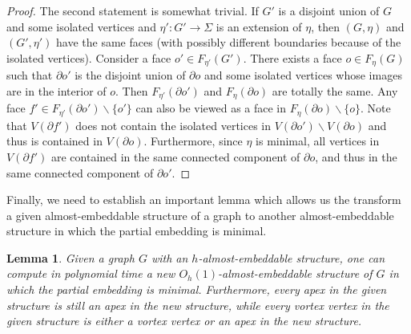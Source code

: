 \documentclass[a4paper,11pt]{article}
\newtheorem{lemma}{Lemma}
\numberwithin{lemma}{section}
\begin{document}
\begin{proof}
The second statement is somewhat trivial.
If $G'$ is a disjoint union of $G$ and some isolated vertices and $\eta'\colon G' \rightarrow \varSigma$ is an extension of $\eta$, then $(G,\eta)$ and $(G',\eta')$ have the same faces (with possibly different boundaries because of the isolated vertices).
Consider a face $o' \in F_{\eta'}(G')$.
There exists a face $o \in F_\eta(G)$ such that $\partial o'$ is the disjoint union of $\partial o$ and some isolated vertices whose images are in the interior of $o$.
Then $F_{\eta'}(\partial o')$ and $F_\eta(\partial o)$ are totally the same.
Any face $f' \in F_{\eta'}(\partial o') \backslash \{o'\}$ can also be viewed as a face in $F_\eta(\partial o) \backslash \{o\}$.
Note that $V(\partial f')$ does not contain the isolated vertices in $V(\partial o') \backslash V(\partial o)$ and thus is contained in $V(\partial o)$.
Furthermore, since $\eta$ is minimal, all vertices in $V(\partial f')$ are contained in the same connected component of $\partial o$, and thus in the same connected component of $\partial o'$.
\end{proof}

Finally, we need to establish an important lemma which allows us the transform a given almost-embeddable structure of a graph to another almost-embeddable structure in which the partial embedding is minimal.

\begin{lemma}\label{lem-minimal}
Given a graph $G$ with an $h$-almost-embeddable structure, one can compute in polynomial time a new $O_h(1)$-almost-embeddable structure of $G$ in which the partial embedding is minimal.
Furthermore, every apex in the given structure is still an apex in the new structure, while every vortex vertex in the given structure is either a vortex vertex or an apex in the new structure.
\end{lemma}
\end{document}
